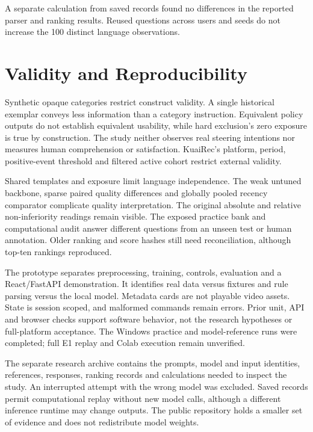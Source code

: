 \documentclass[conference]{IEEEtran}
\begin{document}
A separate calculation from saved records found no differences in the reported parser and ranking results. Reused questions across users and seeds do not increase the 100 distinct language observations.

\section{Validity and Reproducibility}
Synthetic opaque categories restrict construct validity. A single historical exemplar conveys less information than a category instruction. Equivalent policy outputs do not establish equivalent usability, while hard exclusion's zero exposure is true by construction. The study neither observes real steering intentions nor measures human comprehension or satisfaction. KuaiRec's platform, period, positive-event threshold and filtered active cohort restrict external validity.

Shared templates and exposure limit language independence. The weak untuned backbone, sparse paired quality differences and globally pooled recency comparator complicate quality interpretation. The original absolute and relative non-inferiority readings remain visible. The exposed practice bank and computational audit answer different questions from an unseen test or human annotation. Older ranking and score hashes still need reconciliation, although top-ten rankings reproduced.

The prototype separates preprocessing, training, controls, evaluation and a React/FastAPI demonstration. It identifies real data versus fixtures and rule parsing versus the local model. Metadata cards are not playable video assets. State is session scoped, and malformed commands remain errors. Prior unit, API and browser checks support software behavior, not the research hypotheses or full-platform acceptance. The Windows practice and model-reference runs were completed; full E1 replay and Colab execution remain unverified.

The separate research archive contains the prompts, model and input identities, references, responses, ranking records and calculations needed to inspect the study. An interrupted attempt with the wrong model was excluded. Saved records permit computational replay without new model calls, although a different inference runtime may change outputs. The public repository holds a smaller set of evidence and does not redistribute model weights.
\end{document}

